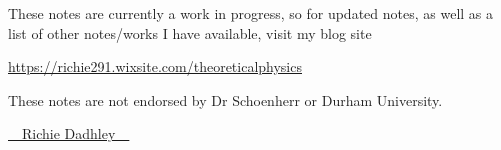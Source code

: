 \documentclass[11pt,oneside]{book}
\theoremstyle{definition} %
\theoremstyle{plain} %
\theoremstyle{remark} %
\theoremstyle{underline}
\begin{document}
These notes are currently a work in progress, so for updated notes, as well as a list of other notes/works I have available, visit my blog site

\begin{center}
    \href{https://richie291.wixsite.com/theoreticalphysics}{https://richie291.wixsite.com/theoreticalphysics}
\end{center}

These notes are not endorsed by Dr Schoenherr or Durham University.

\vspace{1cm}

\begin{flushright}
    \Huge{{\cursive\setul{0.1ex}{}\ul{~~Richie Dadhley~~}}}
\end{flushright}


\tableofcontents


\mainmatter

%








% 
% 



%
\end{document}
